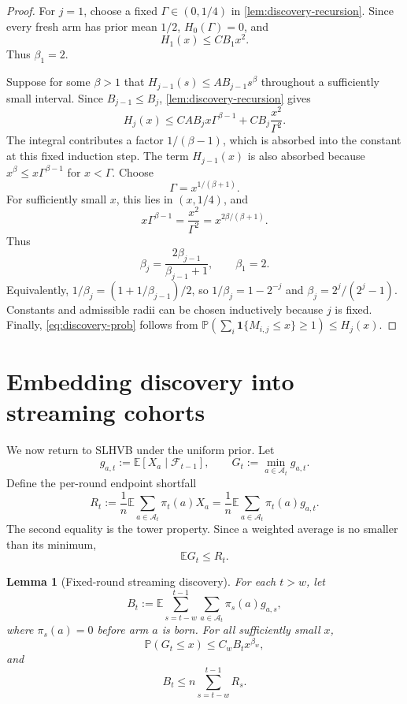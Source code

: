 \documentclass[11pt,letterpaper]{article}
\numberwithin{equation}{section}
\newtheorem{lemma}[lemma]{Lemma}
\theoremstyle{definition}
\theoremstyle{remark}
\newcommand{\E}{\mathbb{E}}
\newcommand{\Pp}{\mathbb{P}}
\newcommand{\1}{\mathbf{1}}
\newcommand{\F}{\mathcal{F}}
\newcommand{\A}{\mathcal{A}}
\begin{document}
\begin{proof}
For $j=1$, choose a fixed $\Gamma\in(0,1/4)$ in
\cref{lem:discovery-recursion}.  Since every fresh arm has prior mean $1/2$,
$H_0(\Gamma)=0$, and
\[
  H_1(x)\le C B_1x^2.
\]
Thus $\beta_1=2$.

Suppose for some $\beta>1$ that
$H_{j-1}(s)\le A B_{j-1}s^\beta$ throughout a sufficiently small interval.
Since $B_{j-1}\le B_j$, \cref{lem:discovery-recursion} gives
\[
  H_j(x)
  \le C A B_j x\Gamma^{\beta-1}
       +C B_j\frac{x^2}{\Gamma^2}.
\]
The integral contributes a factor $1/(\beta-1)$, which is absorbed
into the constant at this fixed induction step. The term $H_{j-1}(x)$
is also absorbed because
$x^\beta\le x\Gamma^{\beta-1}$ for $x<\Gamma$.  Choose
\[
  \Gamma=x^{1/(\beta+1)}.
\]
For sufficiently small $x$, this lies in $(x,1/4)$, and
\[
  x\Gamma^{\beta-1}
  =\frac{x^2}{\Gamma^2}
  =x^{2\beta/(\beta+1)}.
\]
Thus
\[
  \beta_j=\frac{2\beta_{j-1}}{\beta_{j-1}+1},
  \qquad \beta_1=2.
\]
Equivalently,
$1/\beta_j=(1+1/\beta_{j-1})/2$, so
$1/\beta_j=1-2^{-j}$ and
$\beta_j=2^j/(2^j-1)$.  Constants and admissible radii can be chosen
inductively because $j$ is fixed.  Finally,
\cref{eq:discovery-prob} follows from
$\Pp(\sum_i\1\{M_{i,j}\le x\}\ge1)\le H_j(x)$.
\end{proof}

\section{Embedding discovery into streaming cohorts}\label{sec:embedding}

We now return to SLHVB under the uniform prior.  Let
\[
  g_{a,t}:=\E[X_a\mid\F_{t-1}],
  \qquad
  G_t:=\min_{a\in\A_t}g_{a,t}.
\]
Define the per-round endpoint shortfall
\begin{equation}\label{eq:Rt}
  R_t:=\frac1n\E\sum_{a\in\A_t}\pi_t(a)X_a
      =\frac1n\E\sum_{a\in\A_t}\pi_t(a)g_{a,t}.
\end{equation}
The second equality is the tower property.  Since a weighted average is no
smaller than its minimum,
\begin{equation}\label{eq:G-vs-R}
  \E G_t\le R_t.
\end{equation}

\begin{lemma}[Fixed-round streaming discovery]\label{lem:streaming-discovery}
For each $t>w$, let
\begin{equation}\label{eq:Bt}
  B_t:=\E\sum_{s=t-w}^{t-1}\sum_{a\in\A_t}
           \pi_s(a)g_{a,s},
\end{equation}
where $\pi_s(a)=0$ before arm $a$ is born.  For all sufficiently small $x$,
\begin{equation}\label{eq:fixed-round-discovery}
  \Pp(G_t\le x)
  \le C_w B_t x^{\beta_w},
\end{equation}
and
\begin{equation}\label{eq:Bt-upper}
  B_t\le n\sum_{s=t-w}^{t-1}R_s.
\end{equation}
\end{lemma}
\end{document}
